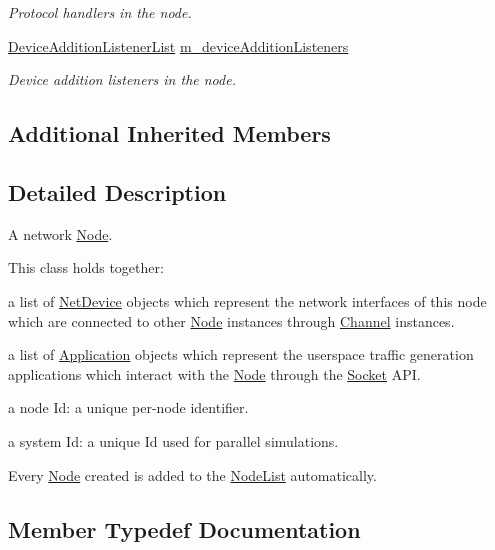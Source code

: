 \begin{DoxyCompactItemize}
\begin{DoxyCompactList}\small\item\em Protocol handlers in the node. \end{DoxyCompactList}\item 
\hyperlink{classns3_1_1Node_a0c4d3ac6f525874c6d1bbde6d086193a}{Device\+Addition\+Listener\+List} \hyperlink{classns3_1_1Node_a2069747966a2e0192d47fbc25e6b5d7f}{m\+\_\+device\+Addition\+Listeners}
\begin{DoxyCompactList}\small\item\em Device addition listeners in the node. \end{DoxyCompactList}\end{DoxyCompactItemize}
\subsection*{Additional Inherited Members}


\subsection{Detailed Description}
A network \hyperlink{classns3_1_1Node}{Node}. 

This class holds together\+:
\begin{DoxyItemize}
\item a list of \hyperlink{classns3_1_1NetDevice}{Net\+Device} objects which represent the network interfaces of this node which are connected to other \hyperlink{classns3_1_1Node}{Node} instances through \hyperlink{classns3_1_1Channel}{Channel} instances.
\item a list of \hyperlink{classns3_1_1Application}{Application} objects which represent the userspace traffic generation applications which interact with the \hyperlink{classns3_1_1Node}{Node} through the \hyperlink{classns3_1_1Socket}{Socket} A\+PI.
\item a node Id\+: a unique per-\/node identifier.
\item a system Id\+: a unique Id used for parallel simulations.
\end{DoxyItemize}

Every \hyperlink{classns3_1_1Node}{Node} created is added to the \hyperlink{classns3_1_1NodeList}{Node\+List} automatically. 

\subsection{Member Typedef Documentation}
